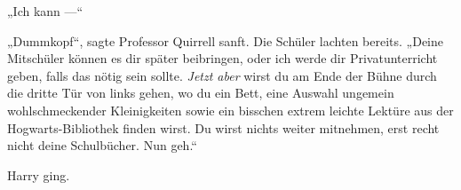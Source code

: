 „Ich kann —“

„Dummkopf“, sagte Professor Quirrell sanft. Die Schüler lachten bereits.
„Deine Mitschüler können es dir später beibringen, oder ich werde dir Privatunterricht geben, falls das nötig sein sollte. \emph{Jetzt aber} wirst du am Ende der Bühne durch die dritte Tür von links gehen, wo du ein Bett, eine Auswahl ungemein wohlschmeckender Kleinigkeiten sowie ein bisschen extrem leichte Lektüre aus der Hogwarts-Bibliothek finden wirst. Du wirst nichts weiter mitnehmen, erst recht nicht deine Schulbücher. Nun geh.“

Harry ging.

